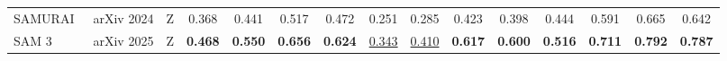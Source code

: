 \begin{table}[t]
{\begin{tabular}{l l c cccc cccc cccc}
SAMURAI~\cite{yang2024samurai}     & arXiv 2024 & Z & 0.368             & 0.441             & 0.517             & 0.472             & 0.251             & 0.285             & 0.423             & 0.398             & 0.444             & 0.591             & 0.665             & 0.642             \\
SAM 3~\cite{carion2025sam}       & arXiv 2025 & Z & \textbf{0.468}    & \textbf{0.550}    & \textbf{0.656}    & \textbf{0.624}    & \underline{0.343} & \underline{0.410} & \textbf{0.617}    & \textbf{0.600}    & \textbf{0.516}    & \textbf{0.711}    & \textbf{0.792}    & \textbf{0.787}    \\
\bottomrule
\end{tabular}
}
\end{table}